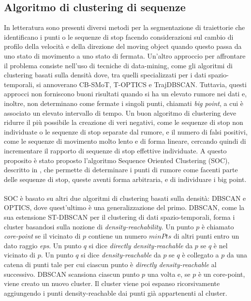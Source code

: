 \documentclass[12pt]{article}
\begin{document}
\subsection{Algoritmo di clustering di sequenze}
In letteratura sono presenti diversi metodi per la segmentazione di traiettorie che identificano i punti o le sequenze di stop facendo considerazioni sul cambio di profilo della velocità e della direzione del moving object quando questo passa da uno stato di movimento a uno stato di fermata.
Un'altro approccio per affrontare il problema consiste nell'uso di tecniche di data-mining, come gli algoritmi di clustering basati sulla densità dove, tra quelli specializzati per i dati spazio-temporali, si annoverano CB-SMoT, T-OPTICS e TrajDBSCAN.
Tuttavia, questi approcci non forniscono buoni risultati quando si ha un elevato rumore nei dati e, inoltre, non determinano come fermate i singoli punti, chiamati \emph{big point}, a cui è associato un elevato intervallo di tempo.
Un buon algoritmo di clustering deve ridurre il più possibile la creazione di veri negativi, come le sequenze di stop non individuate o le sequenze di stop separate dal rumore, e il numero di falsi positivi, come le sequenze di movimento molto lento e di forma lineare, cercando quindi di incrementare il rapporto di sequenze di stop effettive individuate.
A questo proposito è stato proposto l'algoritmo Sequence Oriented Clustering (SOC), descritto in \cite{SequenceClustering}, che permette di determinare i punti di rumore come facenti parte delle sequenze di stop, queste aventi forma arbitraria, e di individuare i big point.\\\\
SOC è basato su altri due algoritmi di clustering basati sulla densità: DBSCAN e OPTICS, dove quest'ultimo è una generalizzazione del primo.
DBSCAN, come la sua estensione ST-DBSCAN per il clustering di dati spazio-temporali, forma i cluster basandosi sulla nozione di \emph{density-reachability}.
Un punto $p$ è chiamato \emph{core-point} se il vicinato di $p$ contiene un numero $minPts$ di altri punti entro un dato raggio \emph{eps}.
Un punto $q$ si dice \emph{directly density-reachable} da $p$ se $q$ è nel vicinato di $p$.
Un punto $q$ si dice \emph{density-reachable} da $p$ se $q$ è collegato a $p$ da una catena di punti tale per cui ciascun punto è \emph{directly density-reachable} al successivo.
DBSCAN scansiona ciascun punto $p$ una volta e, se $p$ è un core-point, viene creato un nuovo cluster.
Il cluster viene poi espanso ricorsivamente aggiungendo i punti density-reachable dai punti già appartenenti al cluster.\\
\end{document}
